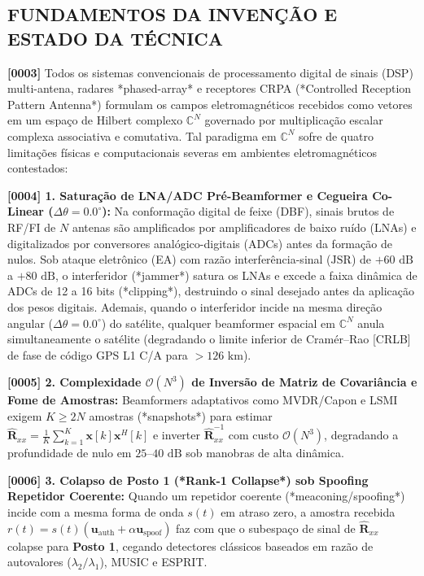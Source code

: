 \documentclass[12pt,a4paper]{article}
\begin{document}
\subsection*{FUNDAMENTOS DA INVEN\c{C}\~AO E ESTADO DA T\'ECNICA}
\textbf{[0003]} Todos os sistemas convencionais de processamento digital de sinais (DSP) multi-antena, radares *phased-array* e receptores CRPA (*Controlled Reception Pattern Antenna*) formulam os campos eletromagn\'eticos recebidos como vetores em um espa\c{c}o de Hilbert complexo $\mathbb{C}^N$ governado por multiplica\c{c}\~ao escalar complexa associativa e comutativa. Tal paradigma em $\mathbb{C}^N$ sofre de quatro limita\c{c}\~oes f\'isicas e computacionais severas em ambientes eletromagn\'eticos contestados:

\textbf{[0004] 1. Satura\c{c}\~ao de LNA/ADC Pr\'e-Beamformer e Cegueira Co-Linear ($\Delta\theta = 0.0^\circ$):} Na conforma\c{c}\~ao digital de feixe (DBF), sinais brutos de RF/FI de $N$ antenas s\~ao amplificados por amplificadores de baixo ru\'ido (LNAs) e digitalizados por conversores anal\'ogico-digitais (ADCs) antes da forma\c{c}\~ao de nulos. Sob ataque eletr\^onico (EA) com raz\~ao interfer\^encia-sinal ($\mathrm{JSR}$) de $+60\text{ dB}$ a $+80\text{ dB}$, o interferidor (*jammer*) satura os LNAs e excede a faixa din\^amica de ADCs de 12 a 16 bits (*clipping*), destruindo o sinal desejado antes da aplica\c{c}\~ao dos pesos digitais. Ademais, quando o interferidor incide na mesma dire\c{c}\~ao angular ($\Delta\theta = 0.0^\circ$) do sat\'elite, qualquer beamformer espacial em $\mathbb{C}^N$ anula simultaneamente o sat\'elite (degradando o limite inferior de Cram\'er--Rao [CRLB] de fase de c\'odigo GPS L1 C/A para $>126\text{ km}$).

\textbf{[0005] 2. Complexidade $\mathcal{O}(N^3)$ de Invers\~ao de Matriz de Covari\^ancia e Fome de Amostras:} Beamformers adaptativos como MVDR/Capon e LSMI exigem $K \ge 2N$ amostras (*snapshots*) para estimar $\hat{\mathbf{R}}_{xx} = \frac{1}{K}\sum_{k=1}^K \mathbf{x}[k]\mathbf{x}^H[k]$ e inverter $\hat{\mathbf{R}}_{xx}^{-1}$ com custo $\mathcal{O}(N^3)$, degradando a profundidade de nulo em $25\text{--}40\text{ dB}$ sob manobras de alta din\^amica.

\textbf{[0006] 3. Colapso de Posto 1 (*Rank-1 Collapse*) sob Spoofing Repetidor Coerente:} Quando um repetidor coerente (*meaconing/spoofing*) incide com a mesma forma de onda $s(t)$ em atraso zero, a amostra recebida $r(t) = s(t)(\mathbf{u}_{\mathrm{auth}} + \alpha \mathbf{u}_{\mathrm{spoof}})$ faz com que o subespa\c{c}o de sinal de $\hat{\mathbf{R}}_{xx}$ colapse para \textbf{Posto 1}, cegando detectores cl\'assicos baseados em raz\~ao de autovalores ($\lambda_2/\lambda_1$), MUSIC e ESPRIT.
\end{document}
